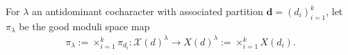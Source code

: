 \documentclass [11pt,oneside,a4paper,mathscr]{amsart}
\newtheorem{lemma}[thm]{Lemma}
\theoremstyle{definition}
\renewcommand{\geq}{\geqslant}
\newcommand{\X}{\mathscr{X}}
\begin{document}
For $\lambda$ an antidominant cocharacter with associated partition $\mathbf{d}=(d_i)_{i=1}^k$,
let $\pi_{\lambda}$ be the good moduli space map 
\begin{align*}\pi_\lambda:=\times_{i=1}^k \pi_{d_i}\colon \X(d)^\lambda\to X(d)^\lambda:=\times_{i=1}^k X(d_i).\end{align*}
\end{document}
